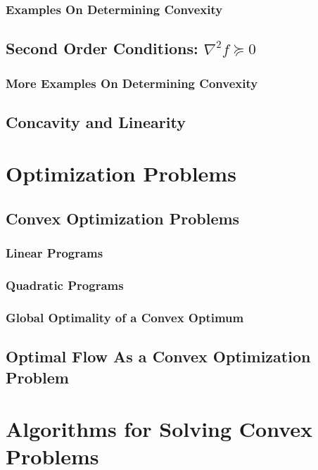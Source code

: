 \documentclass{article}
\begin{document}
\subsubsection{Examples On Determining Convexity}

\subsection{Second Order Conditions: $\nabla^2 f \succeq 0$}

\subsubsection{More Examples On Determining Convexity}

\subsection{Concavity and Linearity}

\section{Optimization Problems}

\subsection{Convex Optimization Problems}

\subsubsection{Linear Programs}

\subsubsection{Quadratic Programs}

\subsubsection{Global Optimality of a Convex Optimum}

\subsection{Optimal Flow As a Convex Optimization Problem}

\section{Algorithms for Solving Convex Problems}
\end{document}

